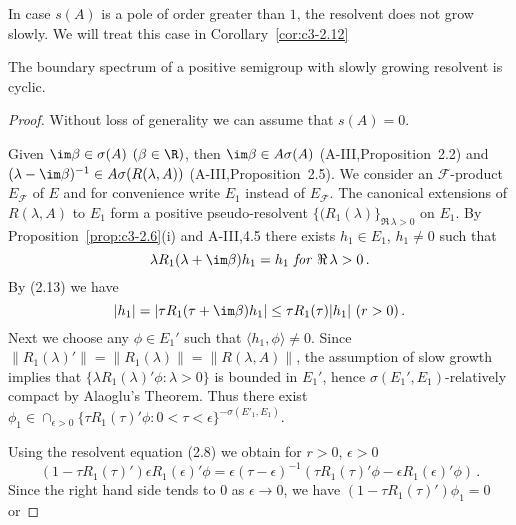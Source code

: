 In case $s(A)$ is a pole of order greater than $1$, the resolvent does not grow slowly.
We will treat this case in Corollary~\ref{cor:c3-2.12}
\begin{theorem}\label{thm:c3-2.10}
	The boundary spectrum of a positive semigroup with slowly growing resolvent is cyclic.
\end{theorem}

\begin{proof}
Without loss of generality we can assume that $s(A) = 0$.

Given $\im\beta \in \sigma(A)$ $(\beta \in \R )$, then $\im\beta \in A\sigma(A)$ (A-III,Proposition~2.2) and $(\lambda-\im\beta)^{-1} \in A\sigma(R(\lambda,A))$ (A-III,Proposition~2.5).
We consider an $\mathcal{F}$-product $E_{\mathcal{F}}$ of $E$ and for convenience write $E_{1}$ instead of $E_{\mathcal{F}}$.
The canonical extensions of $R(\lambda,A)$ to $E_{1}$ form a positive pseudo-resolvent $\{(R_{1}(\lambda)\}_{\Re\,\lambda>0}$ on $E_{1}$.
By Proposition~\ref{prop:c3-2.6}(i) and A-III,4.5 there exists $h_{1} \in E_{1}$, $h_{1} \neq 0$ such that
\begin{equation}\label{eq:c3-2.16}
	\text{$\lambda R_{1}(\lambda+\im\beta)h_{1} = h_{1}$  \textit{for} $\Re\, \lambda > 0$}\,.
\end{equation}
By (2.13) we have
\begin{equation}\label{eq:c3-2.17}
	\text{$|h_{1}| = |\tau R_{1}(\tau+\im\beta)h_{1}| \leq \tau R_{1}(\tau)|h_{1}|$ $(r > 0)$}\,.
\end{equation}
Next we choose any $\phi \in E_{1}'$ such that $\langle  h_{1},\phi \rangle \neq 0$.
Since $\|R_{1}(\lambda)'\| = \|R_{1}(\lambda)\| = \|R(\lambda,A)\|$, the assumption of slow growth implies that $\{\lambda R_{1}(\lambda)'\phi : \lambda > 0\}$ is bounded in $E_{1}'$, hence $\sigma(E_{1}',E_{1})$-relatively compact by Alaoglu's Theorem.
Thus there exist $\phi_{1} \in \cap_{\epsilon>0}\{\tau R_{1}(\tau)'\phi : 0<\tau<\epsilon\}^{-\sigma(E'_1,E_1)}$.

Using the resolvent equation (2.8) we obtain for $r > 0$, $\epsilon > 0$
\[
(1 - \tau R_{1}(\tau)')\epsilon R_{1}(\epsilon)'\phi = \epsilon(\tau-\epsilon)^{-1}(\tau R_{1}(\tau)'\phi - \epsilon R_{1}(\epsilon)'\phi)\,.
\]
Since the right hand side tends to $0$ as $\epsilon \to 0$, we have $(1 - \tau R_{1}(\tau)')\phi_{1} = 0$ or


\end{proof}
